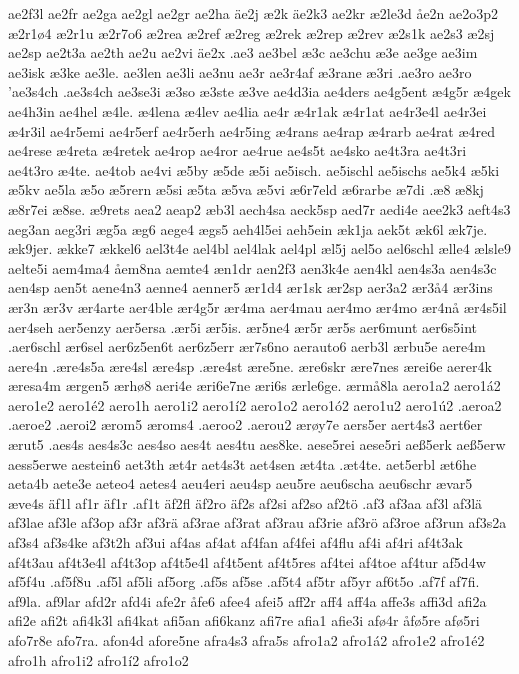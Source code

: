 ae2f3l
ae2fr
ae2ga
ae2gl
ae2gr
ae2ha
äe2j
æ2k
äe2k3
ae2kr
æ2le3d
åe2n
ae2o3p2
æ2r1ø4
æ2r1u
æ2r7o6
æ2rea
æ2ref
æ2reg
æ2rek
æ2rep
æ2rev
æ2s1k
ae2s3
æ2sj
ae2sp
ae2t3a
ae2th
ae2u
ae2vi
äe2x
.ae3
ae3bel
æ3c
ae3chu
æ3e
ae3ge
ae3im
ae3isk
æ3ke
ae3le.
ae3len
ae3li
ae3nu
ae3r
ae3r4af
æ3rane
æ3ri
.ae3ro
ae3ro
'ae3s4ch
.ae3s4ch
ae3se3i
æ3so
æ3ste
æ3ve
ae4d3ia
ae4ders
ae4g5ent
æ4g5r
æ4gek
ae4h3in
ae4hel
æ4le.
æ4lena
æ4lev
ae4lia
ae4r
æ4r1ak
æ4r1at
ae4r3e4l
ae4r3ei
æ4r3il
ae4r5emi
ae4r5erf
ae4r5erh
ae4r5ing
æ4rans
ae4rap
æ4rarb
ae4rat
æ4red
ae4rese
æ4reta
æ4retek
ae4rop
ae4ror
ae4rue
ae4s5t
ae4sko
ae4t3ra
ae4t3ri
ae4t3ro
æ4te.
ae4tob
ae4vi
æ5by
æ5de
æ5i
ae5isch.
ae5ischl
ae5ischs
ae5k4
æ5ki
æ5kv
ae5la
æ5o
æ5rern
æ5si
æ5ta
æ5va
æ5vi
æ6r7eld
æ6rarbe
æ7di
.æ8
æ8kj
æ8r7ei
æ8se.
æ9rets
aea2
aeap2
æb3l
aech4sa
aeck5sp
aed7r
aedi4e
aee2k3
aeft4s3
aeg3an
aeg3ri
æg5a
æg6
aege4
ægs5
aeh4l5ei
aeh5ein
æk1ja
aek5t
æk6l
æk7je.
æk9jer.
ække7
ækkel6
ael3t4e
ael4bl
ael4lak
ael4pl
æl5j
ael5o
ael6schl
ælle4
ælsle9
aelte5i
aem4ma4
åem8na
aemte4
æn1dr
aen2f3
aen3k4e
aen4kl
aen4s3a
aen4s3c
aen4sp
aen5t
aene4n3
aenne4
aenner5
ær1d4
ær1sk
ær2sp
aer3a2
ær3å4
ær3ins
ær3n
ær3v
ær4arte
aer4ble
ær4g5r
ær4ma
aer4mau
aer4mo
ær4mo
ær4nå
ær4s5il
aer4seh
aer5enzy
aer5ersa
.ær5i
ær5is.
ær5ne4
ær5r
ær5s
aer6munt
aer6s5int
.aer6schl
ær6sel
aer6z5en6t
aer6z5err
ær7s6no
aerauto6
aerb3l
ærbu5e
aere4m
aere4n
.ære4s5a
ære4sl
ære4sp
.ære4st
ære5ne.
ære6skr
ære7nes
ærei6e
aerer4k
æresa4m
ærgen5
ærhø8
aeri4e
æri6e7ne
æri6s
ærle6ge.
ærmå8la
aero1a2
aero1á2
aero1e2
aero1é2
aero1h
aero1i2
aero1í2
aero1o2
aero1ó2
aero1u2
aero1ú2
.aeroa2
.aeroe2
.aeroi2
ærom5
æroms4
.aeroo2
.aerou2
ærøy7e
aers5er
aert4s3
aert6er
ærut5
.aes4s
aes4s3c
aes4so
aes4t
aes4tu
aes8ke.
aese5rei
aese5ri
aeß5erk
aeß5erw
aess5erwe
aestein6
aet3th
æt4r
aet4s3t
aet4sen
æt4ta
.æt4te.
aet5erbl
æt6he
aeta4b
aete3e
aeteo4
aetes4
aeu4eri
aeu4sp
aeu5re
aeu6scha
aeu6schr
ævar5
æve4s
äf1l
af1r
äf1r
.af1t
äf2fl
äf2ro
äf2s
af2si
af2so
af2tö
.af3
af3aa
af3l
af3lä
af3lae
af3le
af3op
af3r
af3rä
af3rae
af3rat
af3rau
af3rie
af3rö
af3roe
af3run
af3s2a
af3s4
af3s4ke
af3t2h
af3ui
af4as
af4at
af4fan
af4fei
af4flu
af4i
af4ri
af4t3ak
af4t3au
af4t3e4l
af4t3op
af4t5e4l
af4t5ent
af4t5res
af4tei
af4toe
af4tur
af5d4w
af5f4u
.af5f8u
.af5l
af5li
af5org
.af5s
af5se
.af5t4
af5tr
af5yr
af6t5o
.af7f
af7fi.
af9la.
af9lar
afd2r
afd4i
afe2r
åfe6
afee4
afei5
aff2r
aff4
aff4a
affe3s
affi3d
afi2a
afi2e
afi2t
afi4k3l
afi4kat
afi5an
afi6kanz
afi7re
afia1
afie3i
afø4r
åfø5re
afø5ri
afo7r8e
afo7ra.
afon4d
afore5ne
afra4s3
afra5s
afro1a2
afro1á2
afro1e2
afro1é2
afro1h
afro1i2
afro1í2
afro1o2
